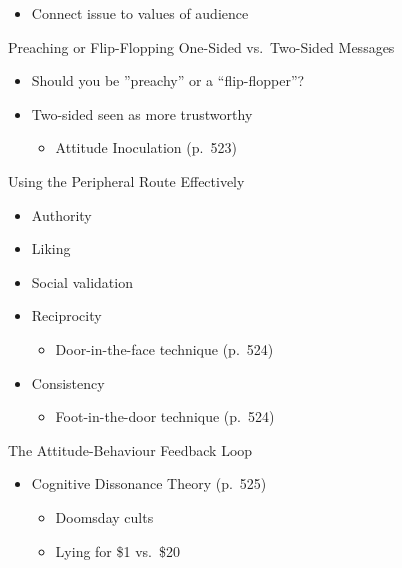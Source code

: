\documentclass[
]{book}
\providecommand{\tightlist}{%
  \setlength{\itemsep}{0pt}\setlength{\parskip}{0pt}}
\begin{document}
\begin{reflect}
\begin{itemize}
  \begin{itemize}
  \tightlist
  \item
    Connect issue to values of audience
  \end{itemize}
\end{itemize}

Preaching or Flip-Flopping One-Sided vs.~Two-Sided Messages

\begin{itemize}
\tightlist
\item
  Should you be ''preachy'' or a ``flip-flopper''?\\
\item
  Two-sided seen as more trustworthy

  \begin{itemize}
  \tightlist
  \item
    Attitude Inoculation (p.~523)
  \end{itemize}
\end{itemize}

Using the Peripheral Route Effectively

\begin{itemize}
\tightlist
\item
  Authority\\
\item
  Liking\\
\item
  Social validation\\
\item
  Reciprocity

  \begin{itemize}
  \tightlist
  \item
    Door-in-the-face technique (p.~524)\\
  \end{itemize}
\item
  Consistency

  \begin{itemize}
  \tightlist
  \item
    Foot-in-the-door technique (p.~524)
  \end{itemize}
\end{itemize}

The Attitude-Behaviour Feedback Loop

\begin{itemize}
\tightlist
\item
  Cognitive Dissonance Theory (p.~525)

  \begin{itemize}
  \tightlist
  \item
    Doomsday cults\\
  \item
    Lying for \$1 vs.~\$20
  \end{itemize}
\end{itemize}


\end{reflect}
\end{document}
